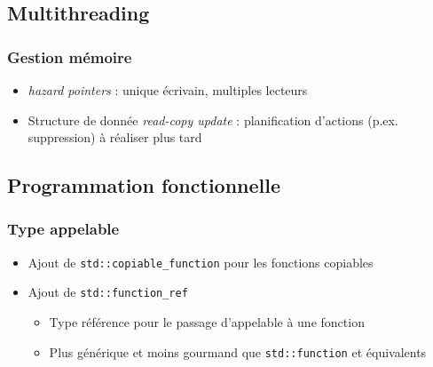 \documentclass[C++.tex]{subfiles}
\begin{document}
\subsection*{Multithreading}
\begin{frame}[fragile]
	\frametitle{Gestion mémoire}
	\begin{itemize}
		\item \textit{hazard pointers} : unique écrivain, multiples lecteurs
		\item Structure de donnée \textit{read-copy update} : planification d'actions (p.ex. suppression) à réaliser plus tard
	\end{itemize}
\end{frame}

\subsection*{Programmation fonctionnelle}
\begin{frame}[fragile]
	\frametitle{Type appelable}
	\begin{itemize}
		\item Ajout de \lstinline|std::copiable_function| pour les fonctions copiables


		\item Ajout de \lstinline|std::function_ref|
		\begin{itemize}
			\item Type référence pour le passage d'appelable à une fonction
			\item Plus générique et moins gourmand que \lstinline|std::function| et équivalents
	
		\end{itemize}
	\end{itemize}
\end{frame}
\end{document}
